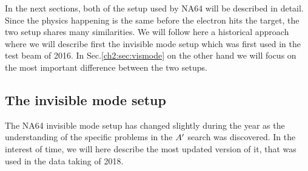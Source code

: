 In the next sections, both of the setup used by NA64 will be described in detail. Since the physics happening is the same before the electron hits the target, the two setup shares many similarities. We will follow here a historical approach where we will describe first the invisible mode setup which was first used in the test beam of 2016. In Sec.\ref{ch2:sec:vismode} on the other hand we will focus on the most important difference between the two setups.


\subsection{The invisible mode setup}
\label{ch2:sec:invismode}

The NA64 invisible mode setup has changed slightly during the year as the understanding of the specific problems in the $A'$ search was discovered. In the interest of time, we will here describe the most updated version of it, that was used in the data taking of 2018.

